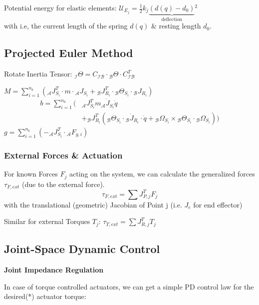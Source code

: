 \documentclass[fontsize=6pt,DIV=calc,a4paper,ngerman]{scrartcl}
\begin{document}
\begin{multicols*}{4}
	Potential energy for elastic elements:
	$\mathcal{U}_{E_j} = \frac{1}{2} k_j\underbrace{(d(q)-d_0)}_{\text{deflection}}{}^2$\\
	with i.e, the current length of the spring $d(q)$ \& resting length $d_0$.


	\subsection{Projected Euler Method}
	Rotate Inertia Tensor: ${}_\mathcal{I}\Theta = C_\mathcal{IB}\cdot {}_\mathcal{B}\Theta \cdot C_\mathcal{IB}^T$

	$\displaystyle M  = \sum_{i=1}^{n_b}({}_\mathcal{A}J_{S_i}^T\cdot m\cdot  {}_\mathcal{A}J_{S_i}+{}_\mathcal{B}J_{R_i}^T\cdot{}_\mathcal{B}\Theta_{S_i}\cdot {}_\mathcal{B}J_{R_i})$\\
	\begin{equation*}\begin{split}
			b  = \sum_{i=1}^{n_b}( & {}_\mathcal{A}J_{S_i}^T m {}_\mathcal{A}\dot{J}_{S_i}\dot{q}
			\\ & + {}_\mathcal{B}J_{R_i}^T({}_\mathcal{B}\Theta_{S_i}\cdot {}_\mathcal{B}\dot{J}_{R_i}\cdot \dot{q}+ {}_\mathcal{B}\Omega_{S_i}\times {}_\mathcal{B}\Theta_{S_i}\cdot {}_\mathcal{B}\Omega_{S_i} ))
		\end{split}\end{equation*}
	$\displaystyle g = \sum_{i=1}^{n_b}(-{}_\mathcal{A}J_{S_i}^T\cdot {}_\mathcal{A}F_{g,i})$


	\subsubsection{External Forces \& Actuation}
	For known Forces $F_j$ acting on the system, we can calculate the generalized forces $\tau_{F,ext}$ (due to the external force).
	$$\tau_{F,ext} = \sum J_{P,j}^T F_j$$
	with the translational (geometric) Jacobian of Point j (i.e. $J_e$ for end effector)

	Similar for external Torques $T_j$:
	$\displaystyle \tau_{T,ext} = \sum J_{R,j}^TT_{j}$

	\subsection{Joint-Space Dynamic Control}
	\textbf{Joint Impedance Regulation}

	In case of torque controlled actuators, we can get a simple PD control law for the desired(*) actuator torque:


\end{multicols*}
\end{document}
